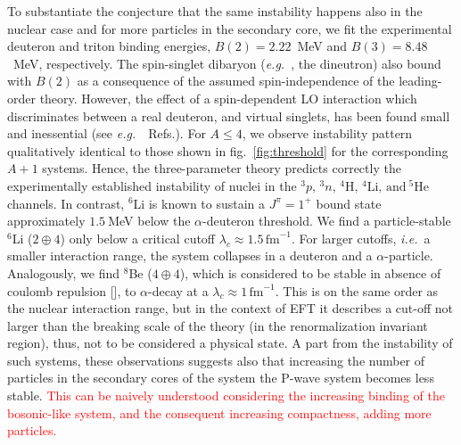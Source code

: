 \documentclass[preprint,12pt]{elsarticle}
\newcommand{\lc}{\ensuremath{\lambda_c}}
\newcommand{\fm}{\ensuremath{\,\text{fm}^{-1}}}
\newcommand{\red}[1]{\textcolor{red}{#1}}
\newcommand{\eg}{\textit{e.g.}~}
\newcommand{\ie}{\textit{i.e.}~}
\newcommand{\figref}[1]{fig.~\ref{#1}}
\begin{document}
To substantiate the conjecture that the same instability happens also in the nuclear case and for more particles in the secondary core, we fit the experimental deuteron and triton binding energies, $B(2)=2.22$~MeV and $B(3)=8.48$~MeV, respectively. 
The spin-singlet dibaryon (\eg, the dineutron) also bound with $B(2)$ as a consequence of the assumed spin-independence of the leading-order theory.
However, the effect of a spin-dependent LO interaction which discriminates between a real deuteron, and virtual singlets, has been found small and inessential (see \eg~Refs.\cite{Kirscher:2015yda,Konig:2016utl}).
For $A\le 4$, we observe instability pattern qualitatively identical to those shown in \figref{fig:threshold} for the corresponding $A+1$ systems.
Hence, the three-parameter theory predicts correctly the experimentally established instability of nuclei in the $^3p,\,^3n,\,^4\text{H},\,^4\text{Li},\,\text{and}~^5\text{He}$ channels.
In contrast, $^6$Li is known to sustain a $J^\pi=1^+ $ bound state approximately $1.5~$MeV below the $\alpha$-deuteron threshold.
We find a particle-stable $^6$Li ($2\oplus 4$) only below a critical cutoff $\lc\approx1.5\fm$.
For larger cutoffs, \ie a smaller interaction range, the system collapses in a deuteron and a $\alpha$-particle.
Analogously, we find $^8$Be ($4\oplus 4$), which is considered to be stable in absence of coulomb repulsion [], to  $\alpha$-decay at a $\lc\approx 1\fm$.
This is on the same order as the nuclear interaction range, but in the context of EFT it describes a cut-off not larger than the breaking scale of the theory (in the renormalization invariant region), thus, not to be considered a physical state.
A part from the instability of such systems, these observations suggests also that increasing the number of particles in the secondary cores of the system the P-wave system becomes less stable.
\red{This can be naively understood considering the increasing binding of the bosonic-like system, and the consequent increasing compactness, adding more particles.}
\end{document}
